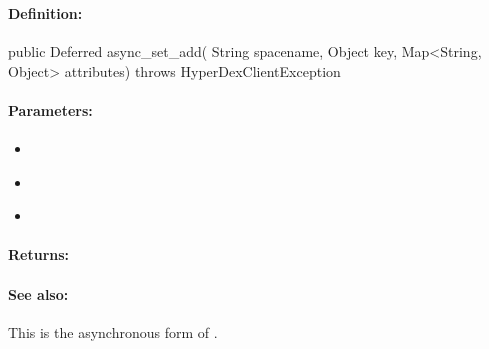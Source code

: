 \subsubsection{}
\label{api:java:async_set_add}


\paragraph{Definition:}
\begin{javacode}
public Deferred async_set_add(
        String spacename,
        Object key,
        Map<String, Object> attributes) throws HyperDexClientException
\end{javacode}

\paragraph{Parameters:}
\begin{itemize}[noitemsep]
\item {}\\

\item {}\\

\item {}\\

\end{itemize}

\paragraph{Returns:}


\paragraph{See also:}  This is the asynchronous form of .

\pagebreak
\subsubsection{}
\label{api:java:cond_set_add}



